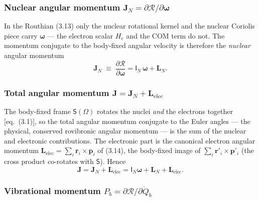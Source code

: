 \subsubsection{Nuclear angular momentum $\mathbf{J}_N=\partial \mathcal{R}/\partial\boldsymbol{\omega}$}

In the Routhian (3.13) only the nuclear rotational kernel and the nuclear Coriolis piece carry $\boldsymbol{\omega}$ --- the electron scalar $H_e$ and the COM term do not. The momentum conjugate to the body-fixed angular velocity is therefore the \emph{nuclear} angular momentum
\begin{equation}
\mathbf{J}_N\;\equiv\;\frac{\partial \mathcal{R}}{\partial\boldsymbol{\omega}}=\mathsf{I}_N\,\boldsymbol{\omega}+\mathbf{L}_N. \tag{3.15}
\end{equation}

\subsubsection{Total angular momentum $\mathbf{J}=\mathbf{J}_N+\mathbf{L}_{\mathrm{elec}}$}

The body-fixed frame $\mathsf{S}(\Omega)$ rotates the nuclei \emph{and} the electrons together [eq.~(3.1)], so the total angular momentum conjugate to the Euler angles --- the physical, conserved rovibronic angular momentum --- is the sum of the nuclear and electronic contributions. The electronic part is the canonical electron angular momentum $\mathbf{L}_{\mathrm{elec}}=\sum_i\bar{\mathbf{r}}_i\!\times\!\bar{\mathbf{p}}_i$ of (3.14), the body-fixed image of $\sum_i\mathbf{r}'_i\!\times\!\mathbf{p}'_i$ (the cross product co-rotates with $\mathsf{S}$). Hence
\begin{equation}
\mathbf{J}=\mathbf{J}_N+\mathbf{L}_{\mathrm{elec}}=\mathsf{I}_N\boldsymbol{\omega}+\mathbf{L}_N+\mathbf{L}_{\mathrm{elec}}. \tag{3.16}
\end{equation}

\subsubsection{Vibrational momentum $P_b=\partial \mathcal{R}/\partial\dot Q_b$}

